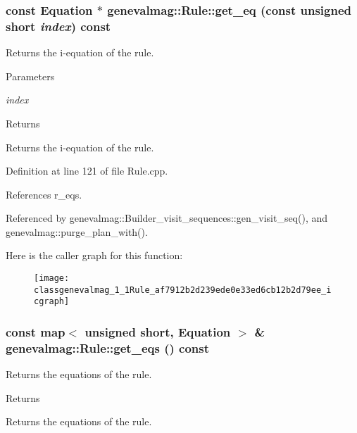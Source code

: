 \hypertarget{classgenevalmag_1_1Rule_af7912b2d239ede0e33ed6cb12b2d79ee}{
\subsubsection[{get\_\-eq}]{\setlength{\rightskip}{0pt plus 5cm}const {\bf Equation} $\ast$ genevalmag::Rule::get\_\-eq (const unsigned short {\em index}) const}}
\label{classgenevalmag_1_1Rule_af7912b2d239ede0e33ed6cb12b2d79ee}
Returns the i-\/equation of the rule. 
\begin{DoxyParams}{Parameters}
\item[{\em index}]\end{DoxyParams}
\begin{DoxyReturn}{Returns}

\end{DoxyReturn}
Returns the i-\/equation of the rule. 

Definition at line 121 of file Rule.cpp.



References r\_\-eqs.



Referenced by genevalmag::Builder\_\-visit\_\-sequences::gen\_\-visit\_\-seq(), and genevalmag::purge\_\-plan\_\-with().



Here is the caller graph for this function:\nopagebreak
\begin{figure}[H]
\begin{center}
\leavevmode
\texttt{[image: classgenevalmag\_1\_1Rule\_af7912b2d239ede0e33ed6cb12b2d79ee\_icgraph]}
\end{center}
\end{figure}


\hypertarget{classgenevalmag_1_1Rule_aa91f94ae6289b840dc17414c59a844a4}{
\subsubsection[{get\_\-eqs}]{\setlength{\rightskip}{0pt plus 5cm}const map$<$ unsigned short, {\bf Equation} $>$ \& genevalmag::Rule::get\_\-eqs () const}}
\label{classgenevalmag_1_1Rule_aa91f94ae6289b840dc17414c59a844a4}
Returns the equations of the rule. \begin{DoxyReturn}{Returns}

\end{DoxyReturn}
Returns the equations of the rule. 

